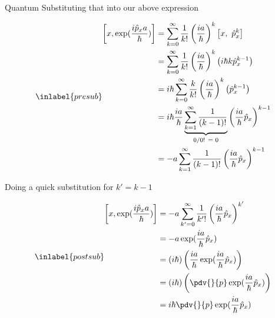 \begin{answer}
\begin{answerpart}{Quantum}
    Substituting that into our above expression

    \begin{equation}
      \inlabel{presub}
      \begin{split}
        \left[x, \exp(\frac{i\hat{p}_xa}{\hbar})\right]
        &=
        \sum_{k=0}^{\infty}\frac{1}{k!}
        \left(\frac{ia}{\hbar}\right)^k
        \left[
          x,\ 
          \hat{p}_x^k
          \right]
        \\
        &=
        \sum_{k=0}^{\infty}\frac{1}{k!}
        \left(\frac{ia}{\hbar}\right)^k
        \left(
        i \hbar k\hat{p}_x^{k-1}
        \right)
        \\
        &=
        i \hbar
        \sum_{k=0}^{\infty}
        \frac{k}{k!}
        \left(\frac{ia}{\hbar}\right)^k
        \left(
        \hat{p}_x^{k-1}
        \right)
        \\
        &=
        i \hbar
        \frac{ia}{\hbar}
        \underbrace{\sum_{k=1}^{\infty}\frac{1}{(k-1)!}}_{\text{0/0! = 0}}
        \left(\frac{ia}{\hbar}\hat{p}_x\right)^{k-1}
        \\
        &=
        -a
        \sum_{k=1}^{\infty}\frac{1}{(k-1)!}
        \left(\frac{ia}{\hbar}\hat{p}_x\right)^{k-1}
        \\
      \end{split}
    \end{equation}

    Doing a quick substitution for $k' = k-1$

    \begin{equation}
      \inlabel{postsub}
      \begin{split}
        \left[x, \exp(\frac{i\hat{p}_xa}{\hbar})\right]
        &=
        -a
        \sum_{k'=0}^{\infty}\frac{1}{k'!}
        \left(\frac{ia}{\hbar}\hat{p}_x\right)^{k'}
        \\
        &=
        -a
        \exp(\frac{ia}{\hbar}\hat{p}_x)
        \\
        &=
        \left(i\hbar\right)
        \left(
        \frac{ia}{\hbar}
        \exp(\frac{ia}{\hbar}\hat{p}_x)
        \right)
        \\
        &=
        \left(i\hbar\right)
        \left(
        \pdv{}{p}
        \exp(\frac{ia}{\hbar}\hat{p}_x)
        \right)
        \\
        &=
        i\hbar
        \pdv{}{p}
        \exp(\frac{ia}{\hbar}\hat{p}_x)
        \\
      \end{split}
    \end{equation}


\end{answerpart}
\end{answer}
